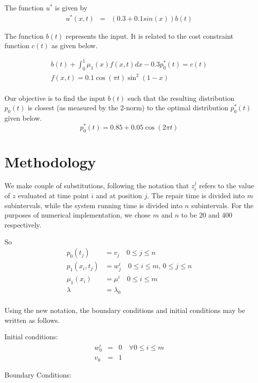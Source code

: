 \documentclass{ifacconf}
\begin{document}
The function $u^*$ is given by
\begin{eqnarray}
u^{*}(x,t) &=& (0.3+0.1 sin(x))b(t) 
\end{eqnarray}

The function $b(t)$ represents the input. It is related to the cost constraint function
$c(t)$ as given below.

\begin{eqnarray}
b(t)+\int_0^1\mu_1(x)f(x,t)dx -0.3p_0^{*}(t) = c(t)\\
f(x,t) = 0.1\cos(\pi t)\sin^2(1-x)\\
\end{eqnarray}

Our objective is to find the input $b(t)$ such that the resulting distribution $p_0(t)$ is
closest (as measured by the 2-norm) to the optimal distribution $p_0^*(t)$ given below.
\begin{equation}
p_0^{*}(t) = 0.85+0.05\cos(2\pi t)
\end{equation}

\section{Methodology}
\label{sec:method}

We make couple of substitutions, following the notation that
$z_i^j$ refers to the value of $z$ evaluated at time point $i$ and at position $j$. The
repair time is divided into $m$ subintervals, while the system running time is divided
into $n$ subintervals. For the purposes of numerical implementation, we chose $m$ and $n$
to be $20$ and $400$ respectively.

So 
\begin{align}
p_0(t_j) &= v_j \quad 0 \le j \le n\\
p_1(x_i,t_j) &= w_j^i \quad 0 \le i \le m, \, 0\le j \le n\\
\mu_1(x_i) &= \mu^i \quad 0 \le i \le m\\
\lambda &= \lambda_0 \\ 
\end{align} 


Using the new notation, the boundary conditions and initial conditions may be written as
follows.


Initial conditions:
\begin{eqnarray}
w_0^{i} &=& 0 \quad \forall 0\le i \le m\\
v_0 &=& 1
\end{eqnarray}

Boundary Conditions:
\end{document}
